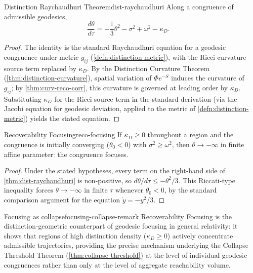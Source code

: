 \documentclass[12pt,twoside,openright]{book}
\begin{document}
\begin{theorem}{Distinction Raychaudhuri Theorem}{dist-raychaudhuri}
  Along a congruence of admissible geodesics,
  \[
    \frac{d\theta}{d\tau}
    = -\frac{1}{3}\theta^2 - \sigma^2 + \omega^2 - \kappa_D.
  \]
\end{theorem}

\begin{proof}
  The identity is the standard Raychaudhuri equation for a
  geodesic congruence under metric $g_{ij}$
  (\cref{defn:distinction-metric}), with the Ricci-curvature
  source term replaced by $\kappa_D$. By the Distinction
  Curvature Theorem (\cref{thm:distinction-curvature}),
  spatial variation of $\Phi e^{-S}$ induces the curvature of
  $g_{ij}$; by \cref{thm:curv-reco-corr}, this curvature is
  governed at leading order by $\kappa_D$. Substituting
  $\kappa_D$ for the Ricci source term in the standard
  derivation (via the Jacobi equation for geodesic
  deviation, applied to the metric of
  \cref{defn:distinction-metric}) yields the stated
  equation.
\end{proof}

\begin{corollary}{Recoverability Focusing}{reco-focusing}
  If $\kappa_D \ge 0$ throughout a region and the congruence
  is initially converging ($\theta_0 < 0$) with
  $\sigma^2 \ge \omega^2$, then $\theta \to -\infty$ in
  finite affine parameter: the congruence focuses.
\end{corollary}

\begin{proof}
  Under the stated hypotheses, every term on the right-hand
  side of \cref{thm:dist-raychaudhuri} is non-positive, so
  $d\theta/d\tau \le -\theta^2/3$. This Riccati-type
  inequality forces $\theta \to -\infty$ in finite $\tau$
  whenever $\theta_0 < 0$, by the standard comparison
  argument for the equation $\dot y = -y^2/3$.
\end{proof}

\begin{remark}{Focusing as collapse}{focusing-collapse-remark}
  Recoverability Focusing is the distinction-geometric
  counterpart of geodesic focusing in general relativity: it
  shows that regions of high distinction density
  ($\kappa_D \ge 0$) actively concentrate admissible
  trajectories, providing the precise mechanism underlying
  the Collapse Threshold Theorem
  (\cref{thm:collapse-threshold}) at the level of individual
  geodesic congruences rather than only at the level of
  aggregate reachability volume.
\end{remark}
\end{document}
